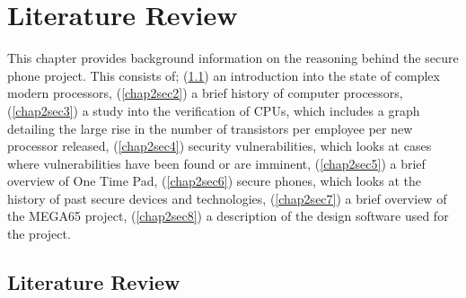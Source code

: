 
\chapter{Literature Review} %

\label{Chapter2} %

This chapter provides background information on the reasoning behind the secure phone project.
This consists of; (\ref{chap2sec1}) an introduction into the state of complex modern processors, (\ref{chap2sec2}) a brief history of computer processors, (\ref{chap2sec3}) a study into the verification of CPUs, which includes a graph detailing the large rise in the number of transistors per employee per new processor released, (\ref{chap2sec4}) security vulnerabilities, which looks at cases where vulnerabilities have been found or are imminent, (\ref{chap2sec5}) a brief overview of One Time Pad, (\ref{chap2sec6}) secure phones, which looks at the history of past secure devices and technologies, (\ref{chap2sec7}) a brief overview of the MEGA65 project, (\ref{chap2sec8}) a description of the design software used for the project.


\section{Literature Review}
\label{chap2sec1}

